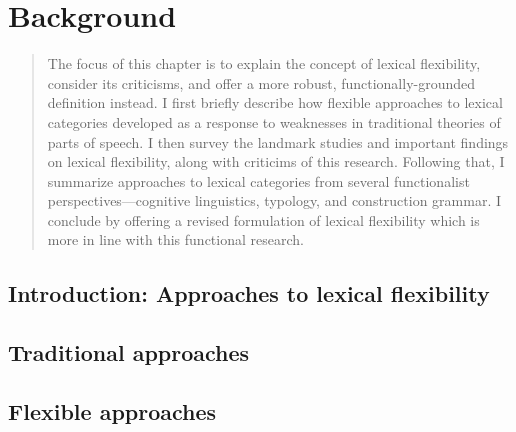 \chapter{Background}
\label{ch:background}

\blockquote{The focus of this chapter is to explain the concept of lexical flexibility, consider its criticisms, and offer a more robust, functionally-grounded definition instead. I first briefly describe how flexible approaches to lexical categories developed as a response to weaknesses in traditional theories of parts of speech. I then survey the landmark studies and important findings on lexical flexibility, along with criticims of this research. Following that, I summarize approaches to lexical categories from several functionalist perspectives—cognitive linguistics, typology, and construction grammar. I conclude by offering a revised formulation of lexical flexibility which is more in line with this functional research.}

\section{Introduction: Approaches to lexical flexibility}
\label{sec:2.1}

\section{Traditional approaches}
\label{sec:2.2}

\section{Flexible approaches}
\label{sec:2.3}

